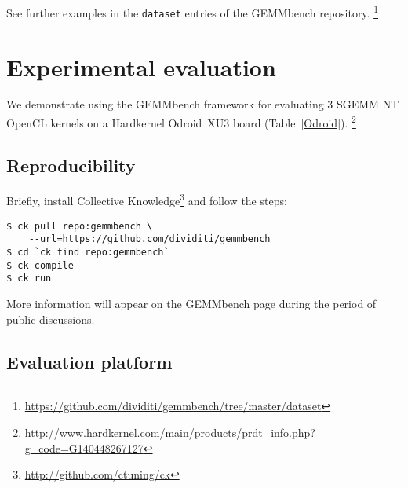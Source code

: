 \documentclass{acm_proc_article-sp} %
\begin{document}
See further examples in the {\tt dataset} entries of the GEMMbench repository.%
\footnote{\url{https://github.com/dividiti/gemmbench/tree/master/dataset}}


\section{Experimental evaluation}
\label{sec:evaluation}

We demonstrate using the GEMMbench framework for evaluating 3 SGEMM NT
OpenCL kernels on a Hardkernel Odroid~XU3 board (Table~\ref{Odroid}).%
\footnote{\url{http://www.hardkernel.com/main/products/prdt_info.php?g_code=G140448267127}}

\subsection{Reproducibility}

Briefly, install Collective Knowledge\footnote{\url{http://github.com/ctuning/ck}}
and follow the steps:
%
\begin{verbatim}
$ ck pull repo:gemmbench \
    --url=https://github.com/dividiti/gemmbench
$ cd `ck find repo:gemmbench`
$ ck compile
$ ck run
\end{verbatim}
%
More information will appear on the GEMMbench page during the period of public discussions.

\subsection{Evaluation platform}
\end{document}
